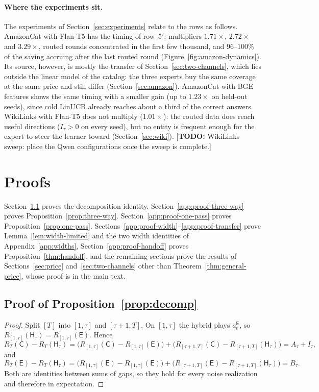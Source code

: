 \documentclass{article}
\theoremstyle{definition}
\theoremstyle{remark}
\theoremstyle{remark}
\newcommand{\todo}[1]{\textcolor{red!70!black}{[\textbf{TODO:} #1]}}
\newcommand{\Cold}{\mathsf{C}}
\newcommand{\Exp}{\mathsf{E}}
\newcommand{\Hyb}{\mathsf{H}}
\begin{document}
\paragraph{Where the experiments sit.}
The experiments of Section~\ref{sec:experiments} relate to the rows as
follows. AmazonCat with Flan-T5 has the timing of row~$5'$: multipliers
$1.71\times$, $2.72\times$ and $3.29\times$, routed rounds concentrated in the
first few thousand, and $96$--$100\%$ of the saving accruing after the last
routed round (Figure~\ref{fig:amazon-dynamics}). Its source, however, is
mostly the transfer of Section~\ref{sec:two-channels}, which lies outside the
linear model of the catalog: the three experts buy the same coverage at the
same price and still differ (Section~\ref{sec:amazon}). AmazonCat with BGE
features shows the same timing with a smaller gain (up to $1.23\times$ on
held-out seeds), since cold LinUCB already reaches about a third of the
correct answers. WikiLinks with Flan-T5 does not multiply ($1.01\times$): the
routed data does reach useful directions ($I_\tau>0$ on every seed), but no
entity is frequent enough for the expert to steer the learner toward
(Section~\ref{sec:wiki}). \todo{WikiLinks sweep: place the Qwen
configurations once the sweep is complete.}

\section{Proofs}
\label{app:proofs}

Section~\ref{app:proof-decomp} proves the decomposition identity.
Section~\ref{app:proof-three-way} proves
Proposition~\ref{prop:three-way}.
Section~\ref{app:proof-one-pass} proves Proposition~\ref{prop:one-pass}.
Sections~\ref{app:proof-width}--\ref{app:proof-transfer} prove
Lemma~\ref{lem:width-limited} and the two width identities of
Appendix~\ref{app:widths}, Section~\ref{app:proof-handoff} proves
Proposition~\ref{thm:handoff}, and the remaining sections prove the results of
Sections~\ref{sec:price} and~\ref{sec:two-channels} other than
Theorem~\ref{thm:general-price}, whose proof is in the main text.

\subsection{Proof of Proposition~\ref{prop:decomp}}
\label{app:proof-decomp}

\begin{proof}
Split $[T]$ into $[1,\tau]$ and $[\tau+1,T]$. On $[1,\tau]$ the hybrid plays
$a_t^{\Exp}$, so $R_{[1,\tau]}(\Hyb_\tau)=R_{[1,\tau]}(\Exp)$. Hence
\[
R_T(\Cold)-R_T(\Hyb_\tau)
=\bigl(R_{[1,\tau]}(\Cold)-R_{[1,\tau]}(\Exp)\bigr)
+\bigl(R_{[\tau+1,T]}(\Cold)-R_{[\tau+1,T]}(\Hyb_\tau)\bigr)
=A_\tau+I_\tau ,
\]
and
\[
R_T(\Exp)-R_T(\Hyb_\tau)
=\bigl(R_{[1,\tau]}(\Exp)-R_{[1,\tau]}(\Exp)\bigr)
+\bigl(R_{[\tau+1,T]}(\Exp)-R_{[\tau+1,T]}(\Hyb_\tau)\bigr)
=B_\tau .
\]
Both are identities between sums of gaps, so they hold for every noise
realization and therefore in expectation.
\end{proof}
\end{document}
